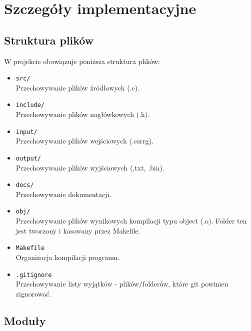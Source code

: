 \documentclass{article}
\begin{document}
\section{Szczegóły implementacyjne}



    \subsection{Struktura plików}

    W projekcie obowiązuje poniższa struktura plików: \\


    \begin{itemize}
        \item \texttt{src/} \\
        Przechowywanie plików źródłowych (.c).
        \item \texttt{include/} \\
        Przechowywanie plików nagłówkowych (.h).
        \item \texttt{input/} \\
        Przechowywanie plików wejściowych (.csrrg).
        \item \texttt{output/} \\
        Przechowywanie plików wyjściowych (.txt, .bin).
        \item \texttt{docs/} \\
        Przechowywanie dokumentacji.
        \item \texttt{obj/} \\
        Przechowywanie plików wynikowych kompilacji typu object (.o). Folder ten jest tworzony i kasowany przez Makefile.
        \item \texttt{Makefile} \\
        Organizacja kompilacji programu.
        \item \texttt{.gitignore} \\
        Przechowywanie listy wyjątków - plików/folderów, które git powinien zignorować.
    \end{itemize}
    
    
    \subsection{Moduły}
\end{document}
